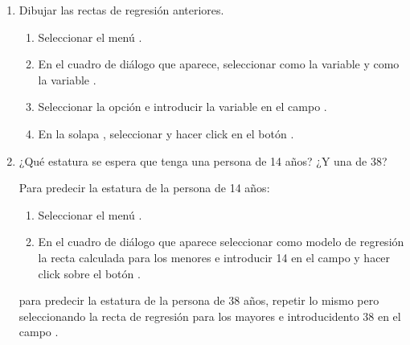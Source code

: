\begin{enumerate}[leftmargin=*]
\begin{enumerate}
\item Dibujar las rectas de regresión anteriores.
\begin{indicacion}{
\begin{enumerate}
\item Seleccionar el menú .
\item En el cuadro de diálogo que aparece, seleccionar como  la variable  y como
 la variable .
\item Seleccionar la opción  e introducir la variable  en el campo
.
\item En la solapa , seleccionar  y hacer click en el botón
.
\end{enumerate}}
\end{indicacion}

\item ¿Qué estatura se espera que tenga una persona de 14 años? ¿Y una de 38?
\begin{indicacion}{
Para predecir la estatura de la persona de 14 años:
\begin{enumerate}
\item Seleccionar el menú .
\item En el cuadro de diálogo que aparece seleccionar como modelo de regresión la recta calculada para los menores e
introducir 14 en el campo  y hacer click sobre el botón
.
\end{enumerate}
para predecir la estatura de la persona de 38 años, repetir lo mismo pero seleccionando la recta de regresión para los
mayores e introducidento 38 en el campo .
}
\end{indicacion}
\end{enumerate}

\end{enumerate}
